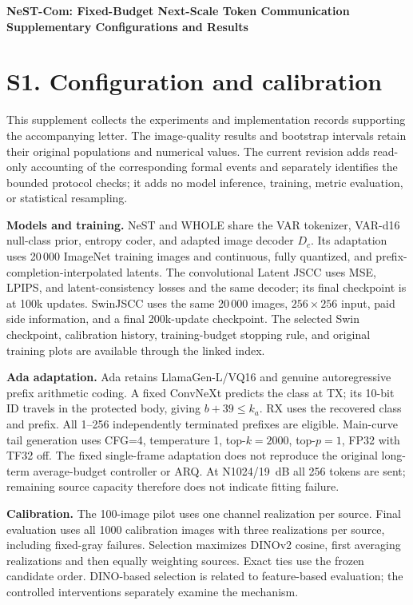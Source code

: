 \documentclass[11pt,letterpaper]{article}
\newcommand{\Dc}{D_c}
\begin{document}
\begin{center}\Large\bfseries NeST-Com: Fixed-Budget Next-Scale Token Communication\\[4pt]\large Supplementary Configurations and Results\end{center}
\section*{S1. Configuration and calibration}
This supplement collects the experiments and implementation records supporting the accompanying letter. The image-quality results and bootstrap intervals retain their original populations and numerical values. The current revision adds read-only accounting of the corresponding formal events and separately identifies the bounded protocol checks; it adds no model inference, training, metric evaluation, or statistical resampling.

\textbf{Models and training.} NeST and WHOLE share the VAR tokenizer, VAR-d16 null-class prior, entropy coder, and adapted image decoder $\Dc$. Its adaptation uses 20\,000 ImageNet training images and continuous, fully quantized, and prefix-completion-interpolated latents. The convolutional Latent JSCC uses MSE, LPIPS, and latent-consistency losses and the same decoder; its final checkpoint is at 100k updates. SwinJSCC uses the same 20\,000 images, $256\times256$ input, paid side information, and a final 200k-update checkpoint. The selected Swin checkpoint, calibration history, training-budget stopping rule, and original training plots are available through the linked index.

\textbf{Ada adaptation.} Ada retains LlamaGen-L/VQ16 and genuine autoregressive prefix arithmetic coding. A fixed ConvNeXt predicts the class at TX; its 10-bit ID travels in the protected body, giving $b+39\leq k_a$. RX uses the recovered class and prefix. All 1--256 independently terminated prefixes are eligible. Main-curve tail generation uses CFG=4, temperature 1, top-$k=2000$, top-$p=1$, FP32 with TF32 off. The fixed single-frame adaptation does not reproduce the original long-term average-budget controller or ARQ. At N1024/19~dB all 256 tokens are sent; remaining source capacity therefore does not indicate fitting failure.

\textbf{Calibration.} The 100-image pilot uses one channel realization per source. Final evaluation uses all 1000 calibration images with three realizations per source, including fixed-gray failures. Selection maximizes DINOv2 cosine, first averaging realizations and then equally weighting sources. Exact ties use the frozen candidate order. DINO-based selection is related to feature-based evaluation; the controlled interventions separately examine the mechanism.
\end{document}
